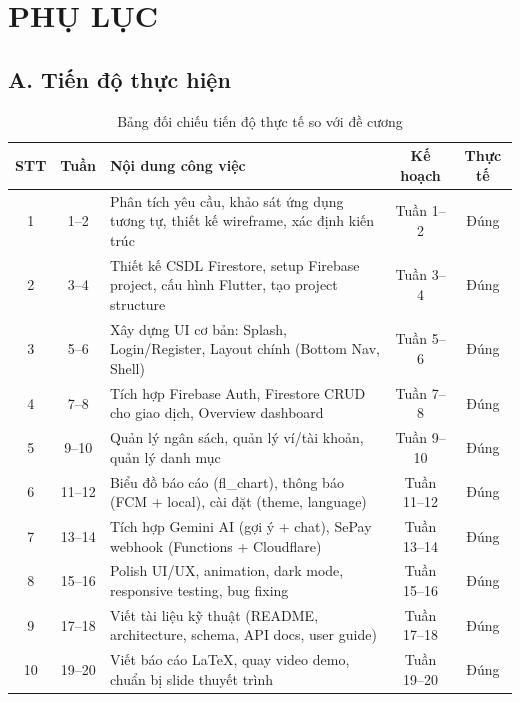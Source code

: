 \chapter*{PHỤ LỤC}

\section*{A. Tiến độ thực hiện}

\begin{table}[H]
\centering
\caption{Bảng đối chiếu tiến độ thực tế so với đề cương}
\label{tab:progress}
\begin{tabularx}{\textwidth}{|c|c|X|c|c|}
\hline
\textbf{STT} & \textbf{Tuần} & \textbf{Nội dung công việc} & \textbf{Kế hoạch} & \textbf{Thực tế} \\
\hline
1 & 1--2 & Phân tích yêu cầu, khảo sát ứng dụng tương tự, thiết kế wireframe, xác định kiến trúc & Tuần 1--2 & Đúng \\
\hline
2 & 3--4 & Thiết kế CSDL Firestore, setup Firebase project, cấu hình Flutter, tạo project structure & Tuần 3--4 & Đúng \\
\hline
3 & 5--6 & Xây dựng UI cơ bản: Splash, Login/Register, Layout chính (Bottom Nav, Shell) & Tuần 5--6 & Đúng \\
\hline
4 & 7--8 & Tích hợp Firebase Auth, Firestore CRUD cho giao dịch, Overview dashboard & Tuần 7--8 & Đúng \\
\hline
5 & 9--10 & Quản lý ngân sách, quản lý ví/tài khoản, quản lý danh mục & Tuần 9--10 & Đúng \\
\hline
6 & 11--12 & Biểu đồ báo cáo (fl\_chart), thông báo (FCM + local), cài đặt (theme, language) & Tuần 11--12 & Đúng \\
\hline
7 & 13--14 & Tích hợp Gemini AI (gợi ý + chat), SePay webhook (Functions + Cloudflare) & Tuần 13--14 & Đúng \\
\hline
8 & 15--16 & Polish UI/UX, animation, dark mode, responsive testing, bug fixing & Tuần 15--16 & Đúng \\
\hline
9 & 17--18 & Viết tài liệu kỹ thuật (README, architecture, schema, API docs, user guide) & Tuần 17--18 & Đúng \\
\hline
10 & 19--20 & Viết báo cáo LaTeX, quay video demo, chuẩn bị slide thuyết trình & Tuần 19--20 & Đúng \\
\hline
\end{tabularx}
\end{table}

